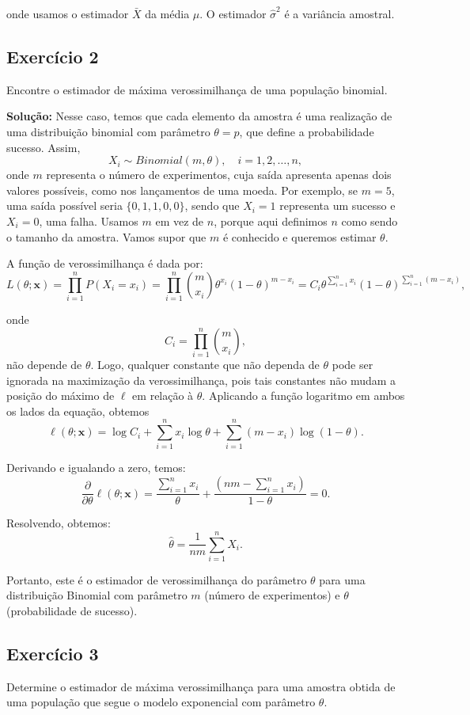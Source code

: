 \documentclass{article}
\begin{document}
onde usamos o estimador $\bar{X}$ da média $\mu$. O estimador $\hat{\sigma}^2$ é a variância amostral.

\subsection{Exercício 2}
Encontre o estimador de máxima verossimilhança de uma população binomial.

\vspace{0.5cm}
\textbf{Solução:} 
Nesse caso, temos que cada elemento da amostra é uma realização de uma distribuição binomial com parâmetro $\theta = p$, que define a probabilidade sucesso. Assim,
    $$X_i \sim Binomial(m, \theta), \quad i = 1, 2, \ldots, n,$$
onde $m$ representa o número de experimentos, cuja saída apresenta apenas dois valores possíveis, como nos lançamentos de uma moeda. Por exemplo, se $m = 5$, uma saída possível seria $\{0, 1, 1, 0, 0\}$, sendo que $X_i = 1$ representa um sucesso e $X_i = 0$, uma falha. Usamos $m$ em vez de $n$, porque aqui definimos $n$ como sendo o tamanho da amostra. Vamos supor que $m$ é conhecido e queremos estimar $\theta$.

A função de verossimilhança é dada por:
    $$L(\theta; \mathbf{x}) = \prod_{i=1}^n P(X_i = x_i) = \prod_{i=1}^n \binom{m}{x_i} \theta^{x_i} (1 - \theta)^{m - x_i} = C_i \theta^{\sum_{i=1}^n x_i}(1 - \theta)^{\sum_{i=1}^n (m - x_i)},$$

onde 
    $$C_i = \prod_{i=1}^n \binom{m}{x_i},$$
não depende de $\theta$. Logo, qualquer constante que não dependa de $\theta$ pode ser ignorada na maximização da verossimilhança, pois tais constantes não mudam a posição do máximo de $\ell$ em relação à $\theta$. Aplicando a função logaritmo em ambos os lados da equação, obtemos
    $$\ell(\theta; \mathbf{x}) = \log C_i + \sum_{i=1}^n x_i \log \theta + \sum_{i=1}^n (m - x_i) \log (1 - \theta).$$

Derivando e igualando a zero, temos:
    $$\frac{\partial}{\partial \theta} \ell(\theta; \mathbf{x}) = \frac{\sum_{i=1}^n x_i}{\theta} + \frac{(nm - \sum_{i=1}^n x_i)}{1 - \theta} = 0.$$

Resolvendo, obtemos:
    $$\hat{\theta} = \frac{1}{nm}\sum_{i=1}^n X_i.$$

Portanto, este é o estimador de verossimilhança do parâmetro $\theta$ para uma distribuição Binomial com parâmetro $m$ (número de experimentos) e $\theta$ (probabilidade de sucesso).

\subsection{Exercício 3}
Determine o estimador de máxima verossimilhança para uma amostra obtida de uma população que segue o modelo exponencial com parâmetro $\theta$.
\end{document}
